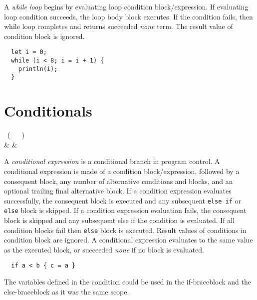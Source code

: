 A \emph{while loop} begins by evaluating loop condition block/expression. If evaluating loop condition succeeds, the loop body block executes. If the condition fails, then while loop completes and returns succeeded \emph{none} term. The result value of condition block is ignored.

\begin{example}
\begin{lstlisting}
  let i = 0;
  while (i < 8; i = i + 1) {
    println(i);
  }
\end{lstlisting}
\end{example}

\section{Conditionals}

\begin{bnf}
   \eq {} \ ( \  \gor {} \ ) \  \\
              & & 
\end{bnf}

A \emph{conditional expression} is a conditional branch in program control. A conditional expression is made of a condition block/expression, followed by a consequent block, any number of alternative conditions and blocks, and an optional trailing final alternative block. If a condition expression evaluates successfully, the consequent block is executed and any subsequent \lstinline{else if} or \lstinline{else} block is skipped. If a condition expression evaluation fails, the consequent block is skipped and any subsequent else if the condition is evaluated. If all condition blocks fail then \lstinline{else} block is executed. Result values of conditions in condition block are ignored. A conditional expression evaluates to the same value as the executed block, or succeeded \emph{none} if no block is evaluated.

\begin{example}
\begin{lstlisting}
  if a < b { c = a } 
\end{lstlisting}
\end{example}

The variables defined in the condition could be used in the if-braceblock and the else-braceblock as it was the same scope.

